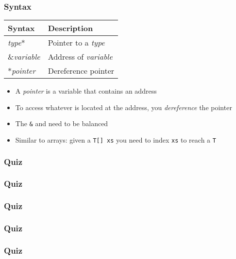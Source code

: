 \documentclass{../ucll-slides}
\begin{document}
\begin{frame}
  \frametitle{Syntax}
  \begin{center}
    \begin{tabular}{ll}
      \textbf{Syntax}  & \textbf{Description} \\
      \toprule
      {\it type}*      & Pointer to a {\it type} \\
      \&{\it variable} & Address of {\it variable} \\
      *{\it pointer}   & Dereference pointer \\
    \end{tabular}
  \end{center}
  \begin{itemize}
    \item A \emph{pointer} is a variable that contains an address
    \item To access whatever is located at the address, you \emph{dereference} the pointer
    \item The {\tt \&} and {\tt *} need to be balanced
    \item Similar to arrays: given a {\tt T[] xs} you need to index {\tt xs} to reach a {\tt T}
  \end{itemize}
\end{frame}

\begin{frame}
  \frametitle{Quiz}
  \begin{center}
  \end{center}
\end{frame}

\begin{frame}
  \frametitle{Quiz}
  \begin{center}
  \end{center}
\end{frame}

\begin{frame}
  \frametitle{Quiz}
  \begin{center}
  \end{center}
\end{frame}

\begin{frame}
  \frametitle{Quiz}
  \begin{center}
  \end{center}
\end{frame}

\begin{frame}
  \frametitle{Quiz}
  \begin{center}
  \end{center}
\end{frame}


\end{document}
